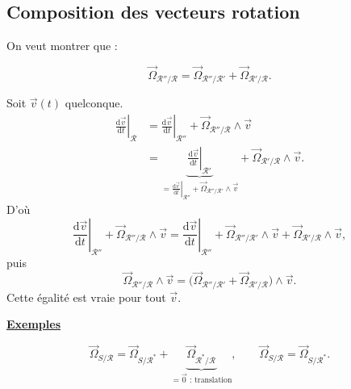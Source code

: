 \documentclass[11pt,a4paper]{article}
\newcommand{\dd}{\mathrm d}
\newcommand{\titr}[1]{\par\textbf{\underline{#1}}\par\nopagebreak[3]}
\newcommand{\etoiles}[1]{\foreach \i in {1,...,#1}{\mathord{\star}\,}}
\newcommand{\R}{\mathcal R}
\newcommand{\Om}{\vec\Omega_{\R'/\R}}
\newcommand{\Os}{\vec\Omega_{S/\R}}
\newcommand{\D}[2]{\left.\frac{\dd #1}{\dd t}\right|_{#2}}
\newcommand{\rep}[1]{\draw[->] (0,0)--(1.15,0);\draw[->] (0,0)--(0,1.3);\draw[->] (0,0)--(-.65,-.8);\node[below right] at (.2,-.15){$#1$};}
\begin{document}
\subsection{Composition des vecteurs rotation}
\begin{center}\end{center}
On veut montrer que :
\begin{cadre}[etoiles={\etoiles{3}}]
\[\vec\Omega_{\R''/\R}=\vec\Omega_{\R''/\R'}+\Om.\]
\end{cadre}
Soit $\vec v(t)$ quelconque.
\begin{align*}
\D{\vec v}{\R}
&=\D{\vec v}{\R''}+\vec\Omega_{\R''/\R}\wedge\vec v\\
&=\underbrace{\D{\vec v}{\R'}}_{=\D{\vec v}{\R''}+\vec\Omega_{\R''/\R'}\wedge\vec v}+\Om\wedge\vec v.
\end{align*}
D'où
\[\D{\vec v}{\R''}+\vec\Omega_{\R''/\R}\wedge\vec v
=\D{\vec v}{\R''}+\vec\Omega_{\R''/\R'}\wedge\vec v+\Om\wedge\vec v,\]
puis
\[\vec\Omega_{\R''/\R}\wedge\vec v
=\bigl(\vec\Omega_{\R''/\R'}+\Om\bigr)\wedge\vec v.\]
Cette égalité est vraie pour tout $\vec v$.
\begin{exemple}
\titr{Exemples}
\begin{center}\end{center}
\[\Os=\vec\Omega_{S/\R^*}+\underbrace{\vec\Omega_{\R^*/\R}}_{=\vec0\text{ : translation}},\qquad
\Os=\vec\Omega_{S/\R^*}.\]
\end{exemple}
\end{document}
